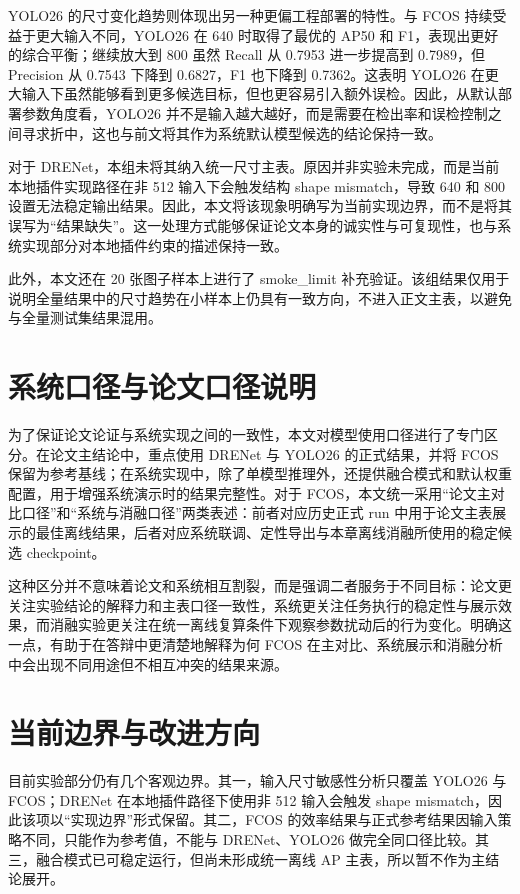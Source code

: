YOLO26 的尺寸变化趋势则体现出另一种更偏工程部署的特性。与 FCOS 持续受益于更大输入不同，YOLO26 在 640 时取得了最优的 AP50 和 F1，表现出更好的综合平衡；继续放大到 800 虽然 Recall 从 0.7953 进一步提高到 0.7989，但 Precision 从 0.7543 下降到 0.6827，F1 也下降到 0.7362。这表明 YOLO26 在更大输入下虽然能够看到更多候选目标，但也更容易引入额外误检。因此，从默认部署参数角度看，YOLO26 并不是输入越大越好，而是需要在检出率和误检控制之间寻求折中，这也与前文将其作为系统默认模型候选的结论保持一致。

对于 DRENet，本组未将其纳入统一尺寸主表。原因并非实验未完成，而是当前本地插件实现路径在非 512 输入下会触发结构 shape mismatch，导致 640 和 800 设置无法稳定输出结果。因此，本文将该现象明确写为当前实现边界，而不是将其误写为“结果缺失”。这一处理方式能够保证论文本身的诚实性与可复现性，也与系统实现部分对本地插件约束的描述保持一致。

此外，本文还在 20 张图子样本上进行了 smoke\_limit 补充验证。该组结果仅用于说明全量结果中的尺寸趋势在小样本上仍具有一致方向，不进入正文主表，以避免与全量测试集结果混用。

\section{系统口径与论文口径说明}

为了保证论文论证与系统实现之间的一致性，本文对模型使用口径进行了专门区分。在论文主结论中，重点使用 DRENet 与 YOLO26 的正式结果，并将 FCOS 保留为参考基线；在系统实现中，除了单模型推理外，还提供融合模式和默认权重配置，用于增强系统演示时的结果完整性。对于 FCOS，本文统一采用“论文主对比口径”和“系统与消融口径”两类表述：前者对应历史正式 run 中用于论文主表展示的最佳离线结果，后者对应系统联调、定性导出与本章离线消融所使用的稳定候选 checkpoint。

这种区分并不意味着论文和系统相互割裂，而是强调二者服务于不同目标：论文更关注实验结论的解释力和主表口径一致性，系统更关注任务执行的稳定性与展示效果，而消融实验更关注在统一离线复算条件下观察参数扰动后的行为变化。明确这一点，有助于在答辩中更清楚地解释为何 FCOS 在主对比、系统展示和消融分析中会出现不同用途但不相互冲突的结果来源。

\section{当前边界与改进方向}

目前实验部分仍有几个客观边界。其一，输入尺寸敏感性分析只覆盖 YOLO26 与 FCOS；DRENet 在本地插件路径下使用非 512 输入会触发 shape mismatch，因此该项以“实现边界”形式保留。其二，FCOS 的效率结果与正式参考结果因输入策略不同，只能作为参考值，不能与 DRENet、YOLO26 做完全同口径比较。其三，融合模式已可稳定运行，但尚未形成统一离线 AP 主表，所以暂不作为主结论展开。

